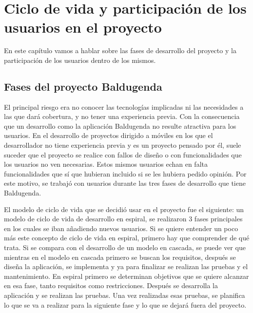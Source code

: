 \chapter{Ciclo de vida y participación de los usuarios en el proyecto}
\label{ch:ciclo de vida}



En este capítulo vamos a hablar sobre las fases de desarrollo del proyecto y la participación de los usuarios dentro de los mismos.

\section{Fases del proyecto Baldugenda}
\label{secc:Fases del proyecto Baldugenda}

El principal riesgo era no conocer las tecnologías implicadas ni las necesidades a las que dará cobertura, y no tener una experiencia previa. Con la consecuencia que un desarrollo como la aplicación Baldugenda no resulte atractiva para los usuarios. En el desarrollo de proyectos dirigido a móviles en los que el desarrollador no tiene experiencia previa y es un proyecto pensado por él, suele suceder que el proyecto se realice con fallos de diseño o con funcionalidades que los usuarios no ven necesarias. Estos mismos usuarios echan en falta funcionalidades que sí que hubieran incluido si se les hubiera pedido opinión. 
Por este motivo, se trabajó con usuarios durante las tres fases de desarrollo que tiene Baldugenda.

El modelo de ciclo de vida que se decidió usar en el proyecto fue el siguiente: un modelo de ciclo de vida de desarrollo en espiral\cite{Espiral}\cite{EspiralBoehm}, se realizaron 3 fases principales en los cuales se iban añadiendo nuevos usuarios.
Si se quiere entender un poco más este concepto de ciclo de vida en espiral, primero hay que comprender de qué trata. Si se compara con el desarrollo de un modelo en cascada, se puede ver que mientras en el modelo en cascada primero se buscan los requisitos, después se diseña la aplicación, se implementa y ya para finalizar se realizan las pruebas y el mantenimiento. 
En espiral primero se determinan objetivos que se quiere alcanzar en esa fase, tanto requisitos como restricciones. Después se desarrolla la aplicación y se realizan las pruebas. Una vez realizadas esas pruebas, se planifica lo que se va a realizar para la siguiente fase y lo que se dejará fuera del proyecto. 

